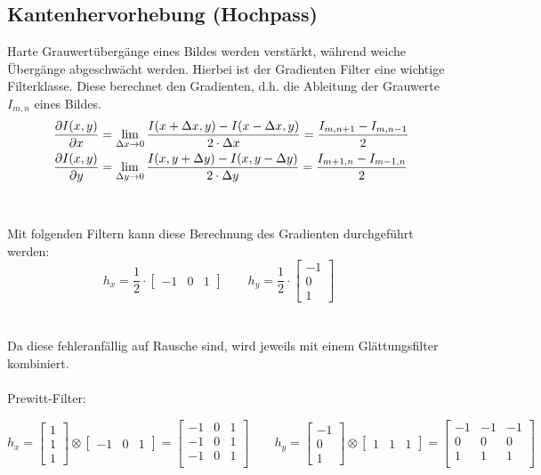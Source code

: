 \subsection{Kantenhervorhebung (Hochpass)}
Harte Grauwertübergänge eines Bildes werden verstärkt, während weiche Übergänge abgeschwächt werden. Hierbei ist der Gradienten Filter eine wichtige Filterklasse.
Diese berechnet den Gradienten, d.h. die Ableitung der Grauwerte $I_{m,n}$ eines Bildes.
\[\begin{aligned}
	\frac{\partial I(x,y)}{\partial x} &= \lim\limits_{\Delta x \rightarrow 0} \frac{I(x + \Delta x,y) - I(x-\Delta x,y)}{2 \cdot \Delta x} = \frac{I_{m,n+1} - I_{m,n-1}}{2}\\
	\frac{\partial I(x,y)}{\partial y} &= \lim\limits_{\Delta y \rightarrow 0} \frac{I(x,y + \Delta y) - I(x,y-\Delta y)}{2 \cdot \Delta y} = \frac{I_{m+1,n} - I_{m-1,n}}{2}
\end{aligned}\]
~\\\\
Mit folgenden Filtern kann diese Berechnung des Gradienten durchgeführt werden:
\[
	h_x = \frac{1}{2} \cdot \left[\begin{matrix}
		-1 & 0 & 1
		\end{matrix}\right] \qquad
	h_y = \frac{1}{2} \cdot \left[\begin{matrix}
		-1 \\ 0 \\ 1
		\end{matrix}\right] \qquad
\]
~\\\\
Da diese fehleranfällig auf Rausche sind, wird jeweils mit einem Glättungsfilter kombiniert.\\
\\
Prewitt-Filter:
\begin{scriptsize}\[
	h_x = \left[\begin{matrix} 1 \\ 1 \\ 1\end{matrix}\right] 
	\otimes \left[\begin{matrix} -1 & 0 & 1	\end{matrix}\right] =
	\left[\begin{matrix}
			-1 & 0 & 1\\
			-1 & 0 & 1\\
			-1 & 0 & 1\\
	\end{matrix}\right]	\qquad
	h_y = \left[\begin{matrix} -1 \\ 0 \\ 1\end{matrix}\right] 
	\otimes \left[\begin{matrix} 1 & 1 & 1	\end{matrix}\right] =
	\left[\begin{matrix}
			-1 & -1 & -1\\
			0 & 0 & 0\\
			1 & 1 & 1\\
	\end{matrix}\right]
\]\end{scriptsize}
